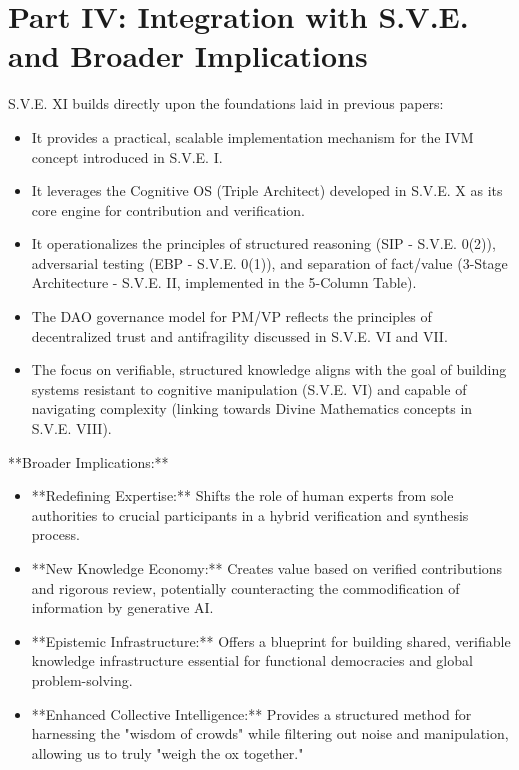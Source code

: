 \documentclass[11pt,a4paper]{article}
\theoremstyle{definition}
\theoremstyle{remark}
\begin{document}
{\section{Part IV: Integration with S.V.E. and Broader Implications}

S.V.E. XI builds directly upon the foundations laid in previous papers:
\begin{itemize}
    \item It provides a practical, scalable implementation mechanism for the IVM concept introduced in S.V.E. I.
    \item It leverages the Cognitive OS (Triple Architect) developed in S.V.E. X as its core engine for contribution and verification.
    \item It operationalizes the principles of structured reasoning (SIP - S.V.E. 0(2)), adversarial testing (EBP - S.V.E. 0(1)), and separation of fact/value (3-Stage Architecture - S.V.E. II, implemented in the 5-Column Table).
    \item The DAO governance model for PM/VP reflects the principles of decentralized trust and antifragility discussed in S.V.E. VI and VII.
    \item The focus on verifiable, structured knowledge aligns with the goal of building systems resistant to cognitive manipulation (S.V.E. VI) and capable of navigating complexity (linking towards Divine Mathematics concepts in S.V.E. VIII).
\end{itemize}

**Broader Implications:**
\begin{itemize}
    \item **Redefining Expertise:** Shifts the role of human experts from sole authorities to crucial participants in a hybrid verification and synthesis process.
    \item **New Knowledge Economy:** Creates value based on verified contributions and rigorous review, potentially counteracting the commodification of information by generative AI.
    \item **Epistemic Infrastructure:** Offers a blueprint for building shared, verifiable knowledge infrastructure essential for functional democracies and global problem-solving.
    \item **Enhanced Collective Intelligence:** Provides a structured method for harnessing the "wisdom of crowds" while filtering out noise and manipulation, allowing us to truly "weigh the ox together."
\end{itemize}

}
\end{document}

